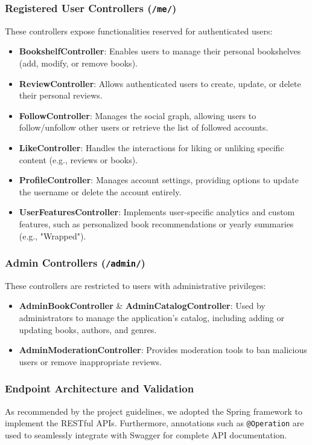 \subsubsection*{Registered User Controllers (\texttt{/me/})}
These controllers expose functionalities reserved for authenticated users:
\begin{itemize}
    \item \textbf{BookshelfController}: Enables users to manage their personal bookshelves (add, modify, or remove books).
    \item \textbf{ReviewController}: Allows authenticated users to create, update, or delete their personal reviews.
    \item \textbf{FollowController}: Manages the social graph, allowing users to follow/unfollow other users or retrieve the list of followed accounts.
    \item \textbf{LikeController}: Handles the interactions for liking or unliking specific content (e.g., reviews or books).
    \item \textbf{ProfileController}: Manages account settings, providing options to update the username or delete the account entirely.
    \item \textbf{UserFeaturesController}: Implements user-specific analytics and custom features, such as personalized book recommendations or yearly summaries (e.g., "Wrapped").
\end{itemize}

\subsubsection*{Admin Controllers (\texttt{/admin/})}
These controllers are restricted to users with administrative privileges:
\begin{itemize}
    \item \textbf{AdminBookController} \& \textbf{AdminCatalogController}: Used by administrators to manage the application's catalog, including adding or updating books, authors, and genres.
    \item \textbf{AdminModerationController}: Provides moderation tools to ban malicious users or remove inappropriate reviews.
\end{itemize}

\subsubsection*{Endpoint Architecture and Validation}
As recommended by the project guidelines, we adopted the Spring framework to implement the RESTful APIs. Furthermore, annotations such as \texttt{@Operation} are used to seamlessly integrate with Swagger for complete API documentation.

